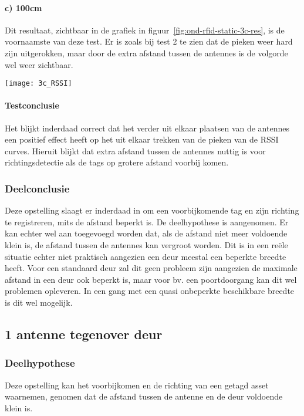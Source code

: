 \paragraph{c) 100cm}
\begin{minipage}{0.55\textwidth}
Dit resultaat, zichtbaar in de grafiek in figuur~\ref{fig:ond-rfid-static-3c-res}, is de voornaamste van deze test. Er is zoals bij test 2 te zien dat de pieken weer hard zijn uitgerokken, maar door de extra afstand tussen de antennes is de volgorde wel weer zichtbaar.
\end{minipage}
\hfill
\begin{minipage}{0.42\textwidth}
	\texttt{[image: 3c\_RSSI]}
	\label{fig:ond-rfid-static-3c-res}
\end{minipage}

\paragraph{Testconclusie}
Het blijkt inderdaad correct dat het verder uit elkaar plaatsen van de antennes een positief effect heeft op het uit elkaar trekken van de pieken van de RSSI curves. Hieruit blijkt dat extra afstand tussen de antennes nuttig is voor richtingsdetectie als de tags op grotere afstand voorbij komen.

\subsubsection{Deelconclusie}
Deze opstelling slaagt er inderdaad in om een voorbijkomende tag en zijn richting te registreren, mits de afstand beperkt is. De deelhypothese is aangenomen. Er kan echter wel aan toegevoegd worden dat, als de afstand niet meer voldoende klein is, de afstand tussen de antennes kan vergroot worden. Dit is in een reële situatie echter niet praktisch aangezien een deur meestal een beperkte breedte heeft. Voor een standaard deur zal dit geen probleem zijn aangezien de maximale afstand in een deur ook beperkt is, maar voor bv. een poortdoorgang kan dit wel problemen opleveren. In een gang met een quasi onbeperkte beschikbare breedte is dit wel mogelijk.

\subsection{1 antenne tegenover deur}
\label{sec:ond-rfid-3}
\subsubsection{Deelhypothese}
Deze opstelling kan het voorbijkomen en de richting van een getagd asset waarnemen, genomen dat de afstand tussen de antenne en de deur voldoende klein is.

